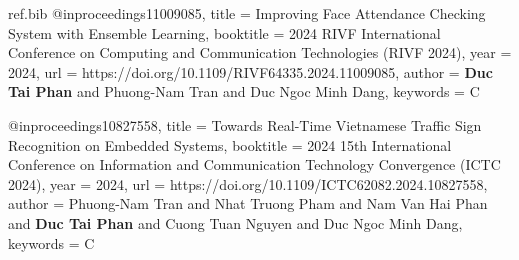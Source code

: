 \begin{filecontents*}{ref.bib}
@inproceedings{11009085,
  title = {Improving Face Attendance Checking System with Ensemble Learning},
  booktitle = {2024 RIVF International Conference on Computing and Communication Technologies (RIVF 2024)},
  year = {2024},
  url = {https://doi.org/10.1109/RIVF64335.2024.11009085},
  author = {\textbf{Duc Tai Phan} and Phuong-Nam Tran and Duc Ngoc Minh Dang},
  keywords = {C}
}

@inproceedings{10827558,
  title = {Towards Real-Time Vietnamese Traffic Sign Recognition on Embedded Systems},
  booktitle = {2024 15th International Conference on Information and Communication Technology Convergence (ICTC 2024)},
  year = {2024},
  url = {https://doi.org/10.1109/ICTC62082.2024.10827558},
  author = {Phuong-Nam Tran and Nhat Truong Pham and Nam Van Hai Phan and \textbf{Duc Tai Phan} and Cuong Tuan Nguyen and Duc Ngoc Minh Dang},
  keywords = {C}
}
\end{filecontents*}


\documentclass[11pt]{article} %
\usepackage[margin=1in]{geometry} %

\usepackage[
  backend=bibtex,     %
  maxnames=20,        %
  style=nature,       %
  sorting=none,       %
  defernumbers=true,  %
]{biblatex}

\usepackage{longtable}

\usepackage{bookmark}

\usepackage{fontawesome}

\usepackage{ragged2e}

\usepackage{soul}

\usepackage{lmodern}
\usepackage[T1]{fontenc}

